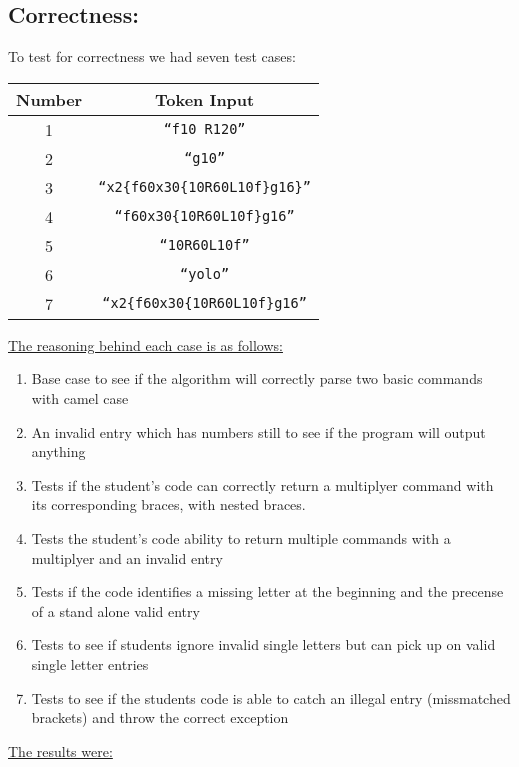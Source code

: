 \documentclass[12pt]{article}
\begin{document}
\subsection{Correctness:}
To test for correctness we had seven test cases:
\begin{table}[H]
	\centering
	\begin{tabular}{cc}
		\toprule
		Number & Token Input \\
		\midrule
		1 & \texttt{``f10 R120''} \\
		2 & \texttt{``g10''} \\
		3 & \texttt{``x2\{f60x30\{10R60L10f\}g16\}''} \\
		4 & \texttt{``f60x30\{10R60L10f\}g16''} \\
		5 & \texttt{``10R60L10f''} \\
		6 & \texttt{``yolo''} \\
		7 & \texttt{``x2\{f60x30\{10R60L10f\}g16''} \\
		\bottomrule
	\end{tabular}
\end{table}
\noindent \underline{The reasoning behind each case is as follows:}
\begin{enumerate}
\item Base case to see if the algorithm will correctly parse two basic commands with camel case
\item An invalid entry which has numbers still to see if the program will output anything
\item Tests if the student's code can correctly return a multiplyer command with its
corresponding braces, with nested braces.
\item Tests the student's code ability to return multiple commands with a multiplyer and an
invalid entry
\item Tests if the code identifies a missing letter at the beginning and the precense of a
stand alone valid entry
\item Tests to see if students ignore invalid single letters but can pick up on valid single
letter entries
\item Tests to see if the students code is able to catch an illegal entry (missmatched brackets)
and throw the correct exception
\end{enumerate}
\newpage
\underline{The results were:}
\end{document}
